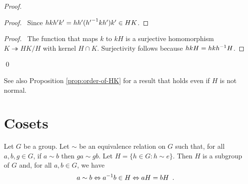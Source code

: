 \begin{proof}
\pf
{}
\begin{proof}
	\pf\ Since $hkh'k' = hh'({h'}^{-1}kh')k' \in HK$.
\end{proof}
\begin{proof}
\pf\ The function that maps $k$ to $kH$ is a surjective homomorphism $K \twoheadrightarrow HK/H$ with kernel $H \cap K$. Surjectivity follows because $hkH = hk{h}^{-1}H$.
\end{proof}
\qed
\end{proof}

See also Proposition \ref{prop:order-of-HK} for a result that holds even if $H$ is not normal.

\section{Cosets}

\begin{prop}
\label{prop:sim-gives-H}
Let $G$ be a group. Let $\sim$ be an equivalence relation on $G$ such that, for all $a,b,g \in G$, if $a \sim b$ then $ga \sim gb$. Let $H = \{ h \in G : h \sim e \}$. Then $H$ is a subgroup of $G$ and, for all $a,b \in G$, we have
\[ a \sim b \Leftrightarrow {a}^{-1} b \in H \Leftrightarrow aH = bH \enspace . \]
\end{prop}

